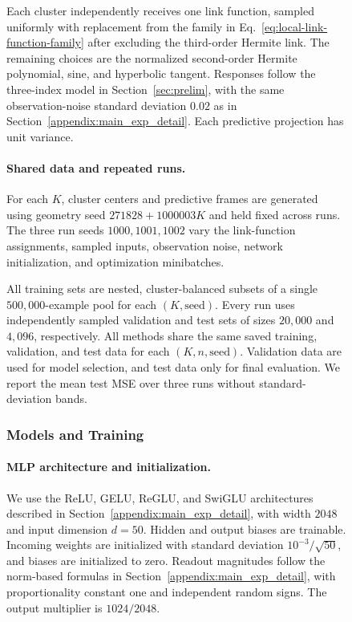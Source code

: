 \documentclass{article}
\newcounter{model}[section]
\newcounter{initialization}[section]
\begin{document}
\begin{figure}
Each cluster independently receives one link function, sampled uniformly
with replacement from the family in Eq.~\ref{eq:local-link-function-family}
after excluding the third-order Hermite link. The remaining choices are
the normalized second-order Hermite polynomial, sine, and hyperbolic tangent.
Responses follow the three-index model in Section~\ref{sec:prelim}, with
the same observation-noise standard deviation \(0.02\) as in
Section~\ref{appendix:main_exp_detail}. Each predictive projection has
unit variance.

\paragraph{Shared data and repeated runs.}
For each \(K\), cluster centers and predictive frames are generated using
geometry seed \(271828+1000003K\) and held fixed across runs.
The three run seeds \(1000,1001,1002\) vary the link-function assignments,
sampled inputs, observation noise, network initialization, and
optimization minibatches.

All training sets are nested, cluster-balanced subsets of a
single \(500{,}000\)-example pool for each \((K,\text{seed})\).
Every run uses independently sampled validation and test sets of sizes
\(20{,}000\) and \(4{,}096\), respectively. All methods share the same
saved training, validation, and test data for each \((K,n,\text{seed})\).
Validation data are used for model selection, and test data only for final
evaluation. We report the mean test MSE over three runs without
standard-deviation bands.

\subsubsection{Models and Training}
\label{app:multiindex-training}

\paragraph{MLP architecture and initialization.}
We use the ReLU, GELU, ReGLU, and SwiGLU architectures described in
Section~\ref{appendix:main_exp_detail}, with width \(2048\) and input
dimension \(d=50\). Hidden and output biases are trainable.
Incoming weights are initialized with standard deviation
\(10^{-3}/\sqrt{50}\),
and biases are initialized to zero. Readout magnitudes follow the
norm-based formulas in Section~\ref{appendix:main_exp_detail}, with
proportionality constant one and independent random signs. The output
multiplier is \(1024/2048\).


\end{figure}
\end{document}
